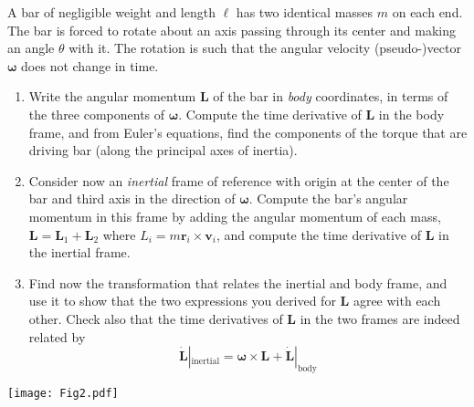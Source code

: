 \documentclass{jhwhw}
\begin{document}
A bar of negligible weight and length $\ell$ has two identical masses $m$ on each end.
The bar is forced to rotate about an axis passing through its center and making an angle $\theta$ with it.
The rotation is such that the angular velocity (pseudo-)vector $\bm \omega$ does not change in time.
\begin{enumerate}
  \item Write the angular momentum $\mathbf L$ of the bar in \emph{body} coordinates, in terms of the three components of $\bm \omega$. Compute the time derivative of $\mathbf L$ in the body frame, and from Euler's equations, find the components of the torque that are driving bar (along the principal axes of inertia).
  \item Consider now an \emph{inertial} frame of reference with origin at the center of the bar and third axis in the direction of $\bm \omega$.
        Compute the bar's angular momentum in this frame by adding the angular momentum of each mass, $\mathbf L = \mathbf L_{1} + \mathbf L_{2}$ where $L_{i} = m \mathbf r_{i} \times \mathbf v_{i}$, and
        compute the time derivative of $\mathbf L$ in the inertial frame.
  \item Find now the transformation that relates the inertial and body frame, and use it to show that the two expressions you derived for $\mathbf L$ agree with each other. Check also that the time derivatives of $\mathbf L$ in the two frames are indeed related by
        \begin{equation}
          \label{eq:1}
          \dot {\mathbf L}|_{\mathrm{inertial}} = \bm \omega \times \mathbf L + \dot{\mathbf L}|_{\mathrm{body}}
        \end{equation}
\end{enumerate}


\begin{center}
  \texttt{[image: Fig2.pdf]}
\end{center}
\end{document}
